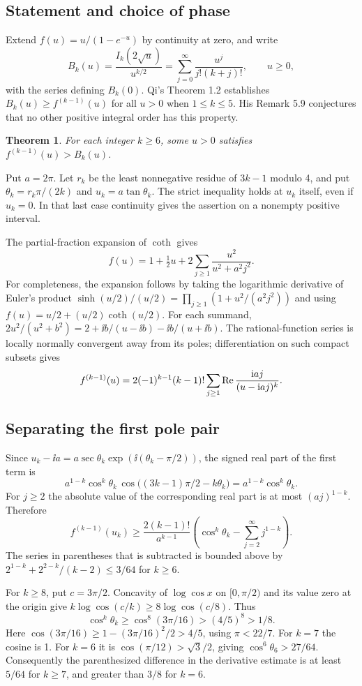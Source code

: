 \documentclass[11pt,a4paper]{article}
\newtheorem*{SourceRccHthm}{Theorem}
\begin{document}
\subsection{Statement and choice of phase}
Extend $f(u)=u/(1-e^{-u})$ by continuity at zero, and write
\[
 B_k(u)=\frac{I_k(2\sqrt u)}{u^{k/2}}
       =\sum_{j=0}^\infty\frac{u^j}{j!(k+j)!},\qquad u\ge0,
\]
with the series defining $B_k(0)$. Qi's Theorem 1.2 establishes
$B_k(u)\ge f^{(k-1)}(u)$ for all $u>0$ when $1\le k\le5$.
His Remark 5.9 conjectures that no other positive integral order
has this property.
\begin{SourceRccHthm}
For each integer $k\ge6$, some $u>0$ satisfies
$f^{(k-1)}(u)>B_k(u)$.
\end{SourceRccHthm}
Put $a=2\pi$. Let $r_k$ be the least nonnegative residue of $3k-1$
modulo 4, and put $\theta_k=r_k\pi/(2k)$ and
$u_k=a\tan\theta_k$. The strict inequality holds at $u_k$ itself,
even if $u_k=0$. In that last case continuity gives the assertion on
a nonempty positive interval.

The partial-fraction expansion of $\coth$ gives
\[
 f(u)=1+\tfrac12u+2\sum_{j\ge1}\frac{u^2}{u^2+a^2j^2}.
\]
For completeness, the expansion follows by taking the logarithmic
derivative of Euler's product
$\sinh(u/2)/(u/2)=\prod_{j\ge1}(1+u^2/(a^2j^2))$
and using $f(u)=u/2+(u/2)\coth(u/2)$.
For each summand, $2u^2/(u^2+b^2)=2+\ii b/(u-\ii b)-\ii b/(u+\ii b)$.
The rational-function series is locally normally convergent away from
its poles; differentiation on such compact subsets gives
\[
 f^{(k-1)}(u)=2(-1)^{k-1}(k-1)!
    \sum_{j\ge1}\operatorname{Re}\frac{\mathrm{i} a j}{(u-\mathrm{i} a j)^k}.
\]

\subsection{Separating the first pole pair}
Since $u_k-\ii a=a\sec\theta_k\exp(\ii(\theta_k-\pi/2))$,
the signed real part of the first term is
\[
 a^{1-k}\cos^k\theta_k\,
 \cos\big((3k-1)\pi/2-k\theta_k\big)
 =a^{1-k}\cos^k\theta_k .
\]
For $j\ge2$ the absolute value of the corresponding real part is at most
$(aj)^{1-k}$. Therefore
\[
 f^{(k-1)}(u_k)\ge\frac{2(k-1)!}{a^{k-1}}\left(
     \cos^k\theta_k-\sum_{j=2}^\infty j^{1-k}\right).
\]
The series in parentheses that is subtracted is bounded above by
$2^{1-k}+2^{2-k}/(k-2)\le 3/64$ for $k\ge6$.

For $k\ge8$, put $c=3\pi/2$. Concavity of $\log\cos x$ on
$[0,\pi/2)$ and its value zero at the origin give
$k\log\cos(c/k)\ge8\log\cos(c/8)$. Thus
\[
 \cos^k\theta_k\ge\cos^8(3\pi/16)>
 (4/5)^8>1/8.
\]
Here $\cos(3\pi/16)\ge1-(3\pi/16)^2/2>4/5$, using $\pi<22/7$.
For $k=7$ the cosine is 1. For $k=6$ it is
$\cos(\pi/12)>\sqrt3/2$, giving $\cos^6\theta_6>27/64$.
Consequently the parenthesized difference in the derivative estimate
is at least $5/64$ for $k\ge7$, and greater than $3/8$ for $k=6$.
\end{document}
